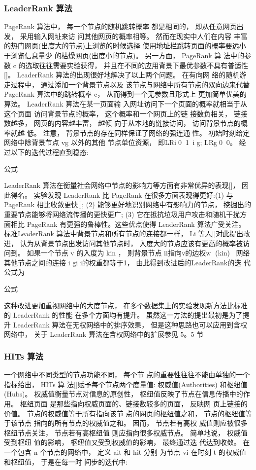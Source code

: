	\subsubsection{LeaderRank 算法}
	PageRank 算法中， 每一个节点的随机跳转概率 都是相同的， 即从任意网页出发， 采用输入网址来访 问其他网页的概率相等。 然而在现实中人们在内容 丰富的热门网页(出度大的节点)上浏览的时候选择 使用地址栏跳转页面的概率要远小于浏览信息量少 的枯燥网页(出度小的节点)。 另一方面， PageRank 算 法中的参数 c 的选取往往需要实验获得， 并且在不同的应用背景下最优参数不具有普适性[]。 LeaderRank 算法的出现很好地解决了以上两个问题。 在有向网 络的随机游走过程中， 通过添加一个背景节点以及 该节点与网络中所有节点的双向边来代替 PageRank 算法中的跳转概率 c， 从而得到一个无参数且形式上 更加简单优美的算法。 LeaderRank 算法在某一页面输 入网址访问下一个页面的概率就相当于从这个页面 访问背景节点的概率， 这个概率和一个网页上的链 接数负相关， 链接数越多， 网页的内容越丰富， 越倾 向于从本地的链接访问， 访问背景节点的概率就越 低。 注意， 背景节点的存在同样保证了网络的强连通 性。 初始时刻给定网络中除背景节点 vg 以外的其他 节点单位资源， 即LRi01，ig; LRg00。 经过以下的迭代过程直到稳态:

				公式

				LeaderRank 算法在衡量社会网络中节点的影响力等方面有非常优异的表现[]， 因此得名。 实验发现 LeaderRank 比 PageRank 在很多方面表现得更好:(1) 与 PageRank 相比收敛更快[]; (2) 能够更好地识别网络中有影响力的节点， 挖掘出的重要节点能够将网络流传播的更快更广; (3) 它在抵抗垃圾用户攻击和随机干扰方面相比 PageRank 有更强的鲁棒性。这些优点使得 LeaderRank 算法广受关注。 标准LeaderRank 算法中背景节点和所有节点的连接都一样， Li 等人[]对此提出改进， 认为从背景节点出发访问其他节点时， 入度大的节点应该有更高的概率被访问到。 如果一个节点 v 的入度为 kin ， 则背景节点 ii指向v的边权w (kin)， 网络其他节点之间的连接 i gi i的权重都等于1， 由此得到改进后的LeaderRank的迭 代公式为

				公式

				这种改进更加重视网络中的大度节点， 在多个数据集上的实验发现新方法比标准的 LeaderRank 的性能 在多个方面均有提升。 虽然这一方法的提出最初是为了提升 LeaderRank 算法在无权网络中的排序效果， 但是这种思路也可以应用到含权网络中， 关于 LeaderRank 算法在含权网络中的扩展参见 5。5 节
	\subsubsection{HITs 算法}
	一个网络中不同类型的节点功能不同， 每个节 点的重要性往往不能由单独的一个指标给出， HITs 算 法[]赋予每个节点两个度量值: 权威值(Authorities) 和枢纽值(Hubs)。 权威值衡量节点对信息的原创性， 枢纽值反映了节点在信息传播中的作用。 枢纽页面 是那些指向权威页面的、链接数较多的页面， 反映网 页上链接的价值。 节点的权威值等于所有指向该节 点的网页的枢纽值之和， 节点的枢纽值等于该节点 指向的所有节点的权威值之和。 因而， 节点若有高权 威值则应被很多枢纽节点关注， 节点若有高枢纽值 则应指向很多权威节点。 简单地说， 权威值受到枢纽 值的影响， 枢纽值又受到权威值的影响， 最终通过迭 代达到收敛。
				在一个包含 n 个节点的网络中， 定义 ait 和 hit 分别 为节点 vi 在时刻 t 的权威值和枢纽值， 于是在每一时 间步的迭代中:

